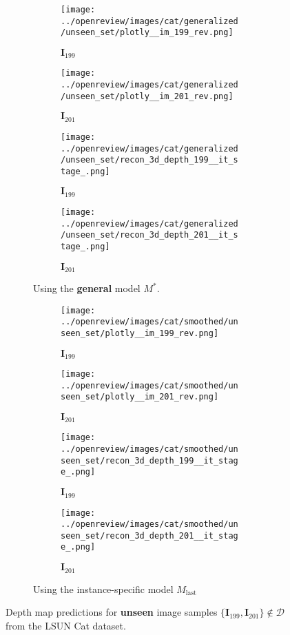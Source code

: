 \begin{figure}[!htb]
\begin{subfigure}{\textwidth}
    

\begin{subfigure}{0.24\textwidth}
    \centering
    \texttt{[image: ../openreview/images/cat/generalized/unseen\_set/plotly\_\_im\_199\_rev.png]}
    \caption*{$\mathbf{I}_{199}$}
\end{subfigure}
\begin{subfigure}{0.24\textwidth}
    \centering
    \texttt{[image: ../openreview/images/cat/generalized/unseen\_set/plotly\_\_im\_201\_rev.png]}
    \caption*{$\mathbf{I}_{201}$}
\end{subfigure}
\begin{subfigure}{0.24\textwidth}
    \centering
    \texttt{[image: ../openreview/images/cat/generalized/unseen\_set/recon\_3d\_depth\_199\_\_it\_stage\_.png]}
    \caption*{$\mathbf{I}_{199}$}
\end{subfigure}
\begin{subfigure}{0.24\textwidth}
    \centering
    \texttt{[image: ../openreview/images/cat/generalized/unseen\_set/recon\_3d\_depth\_201\_\_it\_stage\_.png]}
    \caption*{$\mathbf{I}_{201}$}
\end{subfigure}
    \caption{Using the \textbf{general} model $M^*$.}
\end{subfigure}

\begin{subfigure}{\textwidth}
\begin{subfigure}{0.24\textwidth}
    \centering
    \texttt{[image: ../openreview/images/cat/smoothed/unseen\_set/plotly\_\_im\_199\_rev.png]}
    \caption*{$\mathbf{I}_{199}$}
\end{subfigure}
\begin{subfigure}{0.24\textwidth}
    \centering
    \texttt{[image: ../openreview/images/cat/smoothed/unseen\_set/plotly\_\_im\_201\_rev.png]}
    \caption*{$\mathbf{I}_{201}$}
\end{subfigure}
\begin{subfigure}{0.24\textwidth}
    \centering
    \texttt{[image: ../openreview/images/cat/smoothed/unseen\_set/recon\_3d\_depth\_199\_\_it\_stage\_.png]}
    \caption*{$\mathbf{I}_{199}$}
\end{subfigure}
\begin{subfigure}{0.24\textwidth}
    \centering
    \texttt{[image: ../openreview/images/cat/smoothed/unseen\_set/recon\_3d\_depth\_201\_\_it\_stage\_.png]}
    \caption*{$\mathbf{I}_{201}$}
\end{subfigure}
\caption{Using the instance-specific model $M_{\textrm{last}}$}
\end{subfigure}
    \caption{Depth map predictions for \textbf{unseen} image samples $\{\mathbf{I}_{199}, \mathbf{I}_{201} \} \not\in \mathcal{D}$ from the LSUN Cat dataset.}
    \label{fig:gen_LSUN_Cat_test}
\end{figure}

